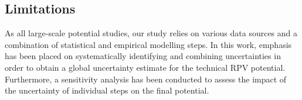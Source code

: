 \subsection{Limitations}
\label{limitations_pv}
As all large-scale potential studies, our study relies on various data sources and a combination of statistical and empirical modelling steps. In this work, emphasis has been placed on systematically identifying and combining uncertainties in order to obtain a global uncertainty estimate for the technical RPV potential. 
Furthermore, a sensitivity analysis has been conducted to assess the impact of the uncertainty of individual steps on the final potential. 

